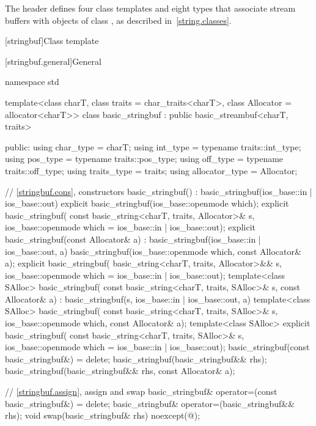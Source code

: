 \pnum
The header  defines four class templates
and eight types that associate stream buffers with objects of class
,
%
as described in~\ref{string.classes}.

[stringbuf]{Class template }

[stringbuf.general]{General}
%
\begin{codeblock}
namespace std {
  template<class charT, class traits = char_traits<charT>,
           class Allocator = allocator<charT>>
  class basic_stringbuf : public basic_streambuf<charT, traits> {
  public:
    using char_type      = charT;
    using int_type       = typename traits::int_type;
    using pos_type       = typename traits::pos_type;
    using off_type       = typename traits::off_type;
    using traits_type    = traits;
    using allocator_type = Allocator;

    // \ref{stringbuf.cons}, constructors
    basic_stringbuf() : basic_stringbuf(ios_base::in | ios_base::out) {}
    explicit basic_stringbuf(ios_base::openmode which);
    explicit basic_stringbuf(
      const basic_string<charT, traits, Allocator>& s,
      ios_base::openmode which = ios_base::in | ios_base::out);
    explicit basic_stringbuf(const Allocator& a)
      : basic_stringbuf(ios_base::in | ios_base::out, a) {}
    basic_stringbuf(ios_base::openmode which, const Allocator& a);
    explicit basic_stringbuf(
      basic_string<charT, traits, Allocator>&& s,
      ios_base::openmode which = ios_base::in | ios_base::out);
    template<class SAlloc>
      basic_stringbuf(
        const basic_string<charT, traits, SAlloc>& s, const Allocator& a)
        : basic_stringbuf(s, ios_base::in | ios_base::out, a) {}
    template<class SAlloc>
      basic_stringbuf(
        const basic_string<charT, traits, SAlloc>& s,
        ios_base::openmode which, const Allocator& a);
    template<class SAlloc>
      explicit basic_stringbuf(
        const basic_string<charT, traits, SAlloc>& s,
        ios_base::openmode which = ios_base::in | ios_base::out);
    basic_stringbuf(const basic_stringbuf&) = delete;
    basic_stringbuf(basic_stringbuf&& rhs);
    basic_stringbuf(basic_stringbuf&& rhs, const Allocator& a);

    // \ref{stringbuf.assign}, assign and swap
    basic_stringbuf& operator=(const basic_stringbuf&) = delete;
    basic_stringbuf& operator=(basic_stringbuf&& rhs);
    void swap(basic_stringbuf& rhs) noexcept(@\seebelow@);

}}
\end{codeblock}
